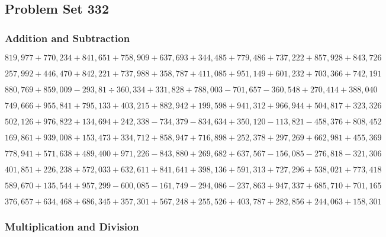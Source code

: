 \hypertarget{problem-set-332}{%
\subsection{Problem Set 332}\label{problem-set-332}}

\hypertarget{addition-and-subtraction}{%
\subsubsection{Addition and
Subtraction}\label{addition-and-subtraction}}

\(819,977+770,234+841,651+758,909+637,693+344,485+779,486+737,222+857,928+843,726\)

\(257,992+446,470+842,221+737,988+358,787+411,085+951,149+601,232+703,366+742,191\)

\(880,769+859,009-293,81÷360,334+331,828+788,003-701,657-360,548+270,414+388,040\)

\(749,666+955,841+795,133+403,215+882,942+199,598+941,312+966,944+504,817+323,326\)

\(502,126+976,822+134,694+242,338-734,379-834,634+350,120-113,821-458,376+808,452\)

\(169,861+939,008+153,473+334,712+858,947+716,898+252,378+297,269+662,981+455,369\)

\(778,941+571,638+489,400+971,226-843,880+269,682+637,567-156,085-276,818-321,306\)

\(401,851+226,238+572,033+632,611+841,641+398,136+591,313+727,296+538,021+773,418\)

\(589,670+135,544+957,299-600,085-161,749-294,086-237,863+947,337+685,710+701,165\)

\(376,657+634,468+686,345+357,301+567,248+255,526+403,787+282,856+244,063+158,301\)

\hypertarget{multiplication-and-division}{%
\subsubsection{Multiplication and
Division}\label{multiplication-and-division}}

